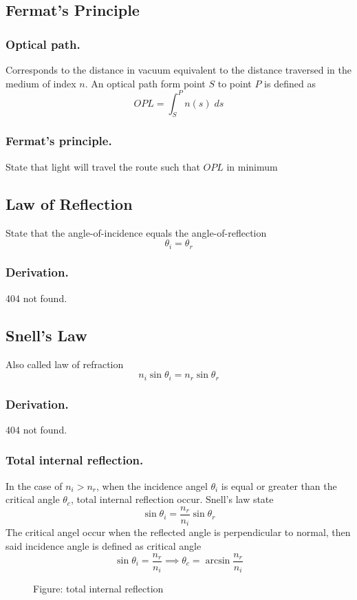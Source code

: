 \documentclass[../../../main.tex]{subfiles}
\begin{document}
\subsection*{Fermat's Principle}
\subsubsection*{Optical path.} Corresponds to the distance in vacuum equivalent to the distance traversed in the medium of index $n$. An  optical path form point $S$ to point $P$ is defined as 
\begin{equation*}
    OPL=\int_{S}^{P}n(s)\;ds
\end{equation*}

\subsubsection*{Fermat's principle.} State that light will travel the route such that $OPL$ in minimum 

\subsection*{Law of Reflection}
State that the angle-of-incidence equals the angle-of-reflection
\begin{equation*}
    \theta_i=\theta_r
\end{equation*}
\subsubsection*{Derivation.} 404 not found.

\subsection*{Snell’s Law}
Also called law of refraction
\begin{equation*}
    n_i\sin\theta_i = n_r\sin\theta_r
\end{equation*}

\subsubsection*{Derivation.} 404 not found.

\subsubsection*{Total internal reflection.} In the case of $n_i>n_r$, when the incidence angel $\theta_i$ is equal or greater than the critical angle $\theta_c$, total internal reflection occur. Snell's law state 
\begin{equation*}
    \sin\theta_i =\frac{n_r}{n_i}\sin\theta_r
\end{equation*}
The critical angel occur when the reflected angle is perpendicular to normal, then said incidence angle is defined as critical angle
\begin{equation*}
    \sin\theta_i =\frac{n_r}{n_i}\implies \theta_c=\arcsin \frac{n_r}{n_i}
\end{equation*}

\begin{figure}[b]
    \centering
    \caption*{Figure: total internal reflection}
\end{figure}
\end{document}
